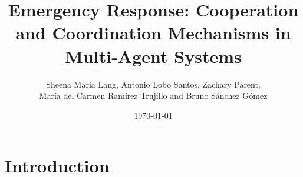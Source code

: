 \documentclass[a4paper,twocolumn]{article}
\title{Emergency Response: Cooperation and Coordination Mechanisms in Multi-Agent Systems}
\author{Sheena Maria Lang, Antonio Lobo Santos, Zachary Parent, \\ María del Carmen Ramírez Trujillo and Bruno Sánchez Gómez}
\date{\today}
\begin{document}
\maketitle
\tableofcontents
\newpage

\section{Introduction}




\end{document}
